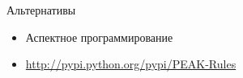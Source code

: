 \documentclass{article}
\begin{document}
\begin{center} Альтернативы \end{center}
\begin{itemize}
    \item Аспектное программирование
    \item \href{PEAK-Rules}{http://pypi.python.org/pypi/PEAK-Rules}
\end{itemize}
\newpage

\end{document}
